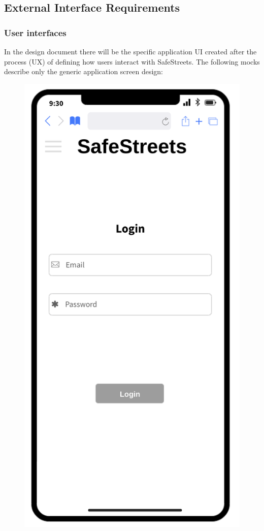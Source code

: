 \subsection{External Interface Requirements}
\subsubsection{User interfaces}
In the design document there will be the specific application UI created after the process (UX) of defining how users interact with SafeStreets.
The following mocks describe only the generic application screen design:

	\begin{figure}[H]
		\centering
		\begin{minipage}[b]{0.40\textwidth}
			\includegraphics[width=\textwidth]{Images/rasd-mocks/login.png}

\end{minipage}
\end{figure}
